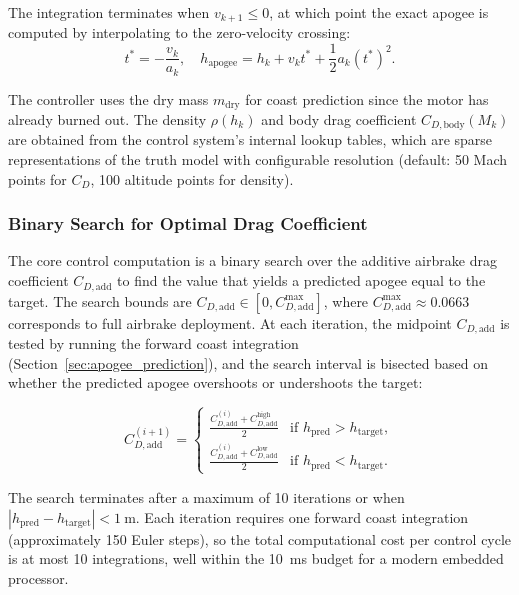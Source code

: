 \documentclass[11pt,letterpaper]{article}
\newcommand{\Cd}{C_D}
\newcommand{\Cdadd}{C_{D,\mathrm{add}}}
\newcommand{\Cdbody}{C_{D,\mathrm{body}}}
\begin{document}
The integration terminates when $v_{k+1} \leq 0$, at which point the exact apogee is computed by interpolating to the zero-velocity crossing:
\begin{equation}
    t^* = -\frac{v_k}{a_k}, \quad h_{\mathrm{apogee}} = h_k + v_k t^* + \frac{1}{2} a_k (t^*)^2.
    \label{eq:apogee_interp}
\end{equation}

The controller uses the dry mass $m_{\mathrm{dry}}$ for coast prediction since the motor has already burned out. The density $\rho(h_k)$ and body drag coefficient $\Cdbody(M_k)$ are obtained from the control system's internal lookup tables, which are sparse representations of the truth model with configurable resolution (default: 50 Mach points for $\Cd$, 100 altitude points for density).

\subsubsection{Binary Search for Optimal Drag Coefficient}
\label{sec:binary_search}

The core control computation is a binary search over the additive airbrake drag coefficient $\Cdadd$ to find the value that yields a predicted apogee equal to the target. The search bounds are $\Cdadd \in [0, \Cdadd^{\max}]$, where $\Cdadd^{\max} \approx 0.0663$ corresponds to full airbrake deployment. At each iteration, the midpoint $\Cdadd$ is tested by running the forward coast integration (Section~\ref{sec:apogee_prediction}), and the search interval is bisected based on whether the predicted apogee overshoots or undershoots the target:

\begin{equation}
    \Cdadd^{(i+1)} = \begin{cases}
        \frac{\Cdadd^{(i)} + \Cdadd^{\mathrm{high}}}{2} & \text{if } h_{\mathrm{pred}} > h_{\mathrm{target}}, \\[6pt]
        \frac{\Cdadd^{(i)} + \Cdadd^{\mathrm{low}}}{2} & \text{if } h_{\mathrm{pred}} < h_{\mathrm{target}}.
    \end{cases}
    \label{eq:binary_search}
\end{equation}

The search terminates after a maximum of 10 iterations or when $|h_{\mathrm{pred}} - h_{\mathrm{target}}| < \SI{1}{\metre}$. Each iteration requires one forward coast integration (approximately 150 Euler steps), so the total computational cost per control cycle is at most 10 integrations, well within the \SI{10}{\milli\second} budget for a modern embedded processor.
\end{document}

